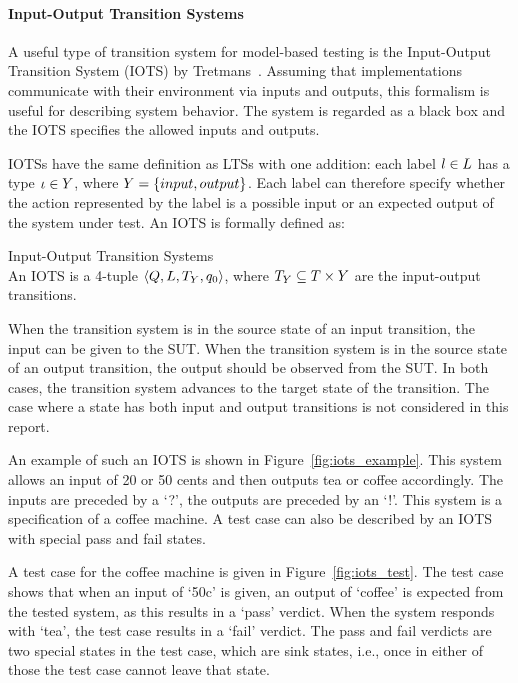 \paragraph*{Input-Output Transition Systems}
A useful type of transition system for model-based testing is the Input-Output Transition System (IOTS) by Tretmans~\cite{Tretmans:testgeneration}. Assuming that implementations communicate with their environment via inputs and outputs, this formalism is useful for describing system behavior. The system is regarded as a black box and the IOTS specifies the allowed inputs and outputs.

IOTSs have the same definition as LTSs with one addition: each label $l \in L$ has a type $\iota \in Y$, where $Y = \{input, output\}$. Each label can therefore specify whether the action represented by the label is a possible input or an expected output of the system under test. An IOTS is formally defined as:
\vspace{10px}
\begin{definition} Input-Output Transition Systems \\
An IOTS is a 4-tuple $\langle Q, L, T_{Y}, q_0\rangle$, where $T_{Y} \subseteq T \times Y$ are the input-output transitions.
\end{definition}
\vspace{10px}
When the transition system is in the source state of an input transition, the input can be given to the SUT. When the transition system is in the source state of an output transition, the output should be observed from the SUT. In both cases, the transition system advances to the target state of the transition. The case where a state has both input and output transitions is not considered in this report.

An example of such an IOTS is shown in Figure~\ref{fig:iots_example}. This system allows an input of 20 or 50 cents and then outputs tea or coffee accordingly. The inputs are preceded by a `?', the outputs are preceded by an `!'. This system is a specification of a coffee machine. A test case can also be described by an IOTS with special pass and fail states. 

A test case for the coffee machine is given in Figure~\ref{fig:iots_test}. The test case shows that when an input of `50c' is given, an output of `coffee' is expected from the tested system, as this results in a `pass' verdict. When the system responds with `tea', the test case results in a `fail' verdict. The pass and fail verdicts are two special states in the test case, which are sink states, i.e., once in either of those the test case cannot leave that state. 

